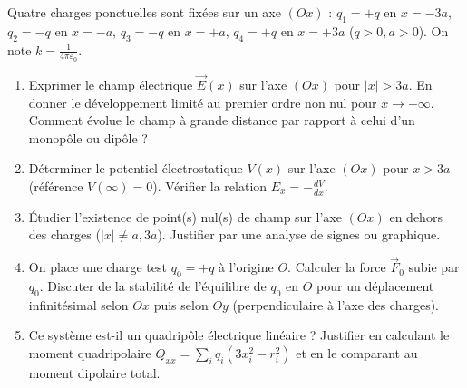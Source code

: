 \documentclass[11pt]{article}
\begin{document}
\begin{exercice}
Quatre charges ponctuelles sont fixées sur un axe $(Ox)$ : $q_1 = +q$ en $x=-3a$, $q_2 = -q$ en $x=-a$, $q_3 = -q$ en $x=+a$, $q_4 = +q$ en $x=+3a$ ($q>0, a>0$). On note $k = \frac{1}{4\pi\varepsilon_0}$.
\begin{enumerate}
    \item Exprimer le champ électrique $\vec{E}(x)$ sur l'axe $(Ox)$ pour $|x| > 3a$. En donner le développement limité au premier ordre non nul pour $x \to +\infty$. Comment évolue le champ à grande distance par rapport à celui d'un monopôle ou dipôle ?
    \item Déterminer le potentiel électrostatique $V(x)$ sur l'axe $(Ox)$ pour $x > 3a$ (référence $V(\infty)=0$). Vérifier la relation $E_x = -\frac{dV}{dx}$.
    \item Étudier l'existence de point(s) nul(s) de champ sur l'axe $(Ox)$ en dehors des charges ($|x| \neq a, 3a$). Justifier par une analyse de signes ou graphique.
    \item On place une charge test $q_0 = +q$ à l'origine $O$. Calculer la force $\vec{F}_0$ subie par $q_0$. Discuter de la stabilité de l'équilibre de $q_0$ en $O$ pour un déplacement infinitésimal selon $Ox$ puis selon $Oy$ (perpendiculaire à l'axe des charges).
    \item Ce système est-il un quadripôle électrique linéaire ? Justifier en calculant le moment quadripolaire $Q_{xx} = \sum_i q_i (3x_i^2 - r_i^2)$ et en le comparant au moment dipolaire total.
\end{enumerate}
\end{exercice}
\end{document}
